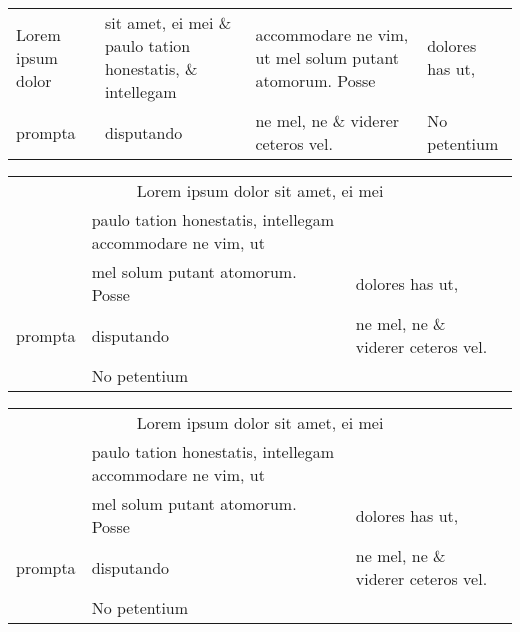 \documentclass{article}
\begin{document}
\begin{tabular}{llll}
  Lorem ipsum dolor & sit amet, ei mei \&
                      paulo tation honestatis, \&
                      intellegam & accommodare ne vim, ut
                                   mel solum putant
                                   atomorum. Posse & dolores has ut,\\
  prompta           & disputando & ne mel, ne
                                   \& viderer ceteros
                                   vel.            & No petentium
\end{tabular}

\begin{tabular}{llll}
  \multicolumn{4}{c}{Lorem ipsum dolor sit amet, ei mei} \\
  & paulo tation honestatis,
    intellegam accommodare ne vim, ut \\
  & mel solum putant atomorum. Posse & dolores has ut, \\
  prompta & disputando & ne mel, ne
                         \& viderer ceteros vel. \\
  & No petentium
\end{tabular}

\begin{table}[tbp]
  \begin{tabular}{llll}
    \multicolumn{4}{c}{Lorem ipsum dolor sit amet, ei mei} \\
    & paulo tation honestatis,
      intellegam accommodare ne vim, ut \\
    & mel solum putant atomorum. Posse & dolores has ut, \\
    prompta & disputando & ne mel, ne
                           \& viderer ceteros vel. \\
    & No petentium
  \end{tabular}
\end{table}
\end{document}
